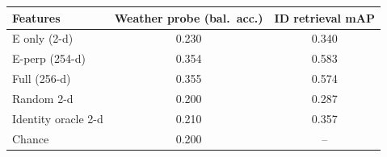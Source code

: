 \begin{tabular}{lcc}
\toprule
Features & Weather probe (bal.\ acc.) & ID retrieval mAP \\
\midrule
E only (2-d) & 0.230 & 0.340 \\
E-perp (254-d) & 0.354 & 0.583 \\
Full (256-d) & 0.355 & 0.574 \\
Random 2-d & 0.200 & 0.287 \\
Identity oracle 2-d & 0.210 & 0.357 \\
\midrule
Chance & 0.200 & -- \\
\bottomrule
\end{tabular}
